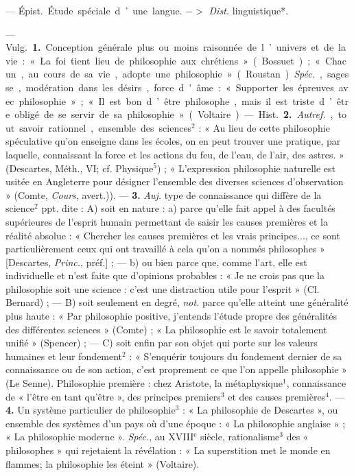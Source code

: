 \begin{itemize}[leftmargin=1cm, label=, itemsep=1pt]
 — \si{Épist.} Étude spéciale d’une
langue. $->$ {\it Dist.} linguistique*.

 — \si{Vulg.} {\bf 1.} Conception
générale plus ou moins raisonnée de
l’univers et de la vie : « La foi tient
lieu de philosophie aux chrétiens »
(Bossuet) ; « Chacun, au cours de sa
vie, adopte une philosophie » (Roustan). {\it Spéc.}, sagesse, modération
dans les désirs, force d'âme : « Supporter les épreuves avec philosophie »; « Il est bon d’être philosophe,
mais il est triste d’être obligé de se
servir de sa philosophie » (Voltaire).

— \si{Hist.} {\bf 2.} {\it Autref.}, tout savoir
rationnel, ensemble des sciences$^2$ :
« Au lieu de cette philosophie spéculative qu’on enseigne dans les écoles,
on en peut trouver une pratique,
par laquelle, connaissant la force et
les actions du feu, de l’eau, de l'air,
des astres. » (Descartes, Méth., VI;
cf. Physique$^5$) ; « L'expression philosophie naturelle est usitée en Angleterre pour désigner l’ensemble des
diverses sciences d'observation »
(Comte, {\it Cours}, avert.)). — {\bf 3.} {\it Auj.}
type de connaissance qui diffère de
la science$^2$ ppt. dite : A) soit en
nature : a) parce qu’elle fait appel à
des facultés supérieures de l’esprit
humain permettant de saisir les
causes premières et la réalité absolue : « Chercher les causes premières
et les vrais principes..., ce sont particulièrement ceux qui ont travaillé
à cela qu’on a nommés philosophes »
[Descartes, {\it Princ.}, préf.] ; — b) ou
bien parce que, comme l’art, elle est
individuelle et n’est faite que d'opinions probables : « Je ne crois pas
que la philosophie soit une science :
c’est une distraction utile pour
l'esprit » (Cl. Bernard) ; — B) soit
seulement en degré, {\it not.} parce qu’elle
atteint une généralité plus haute :
« Par philosophie positive, j'entends
l’étude propre des généralités des
différentes sciences » (Comte) ; « La
philosophie est le savoir totalement
unifié » (Spencer) ; — C) soit enfin
par son objet qui porte sur les valeurs
humaines et leur fondement$^2$ : « S’enquérir toujours du fondement dernier de sa connaissance ou de son
action, c’est proprement ce que l’on
appelle philosophie » (Le Senne).
Philosophie première : chez Aristote,
la métaphysique$^1$, connaissance de
« l'être en tant qu'être », des principes premiers$^3$ et des causes premières$^4$. — {\bf 4.} Un système particulier de philosophie$^3$ : « La philosophie de Descartes », ou ensemble des
systèmes d'un pays où d’une époque : « La philosophie anglaise » ;
« La philosophie moderne ». {\it Spéc.},
au {\footnotesize XVIII}$^\text{e}$ siècle, rationalisme$^3$ des
« philosophes » qui rejetaient la
révélation : « La superstition met le
monde en flammes; la philosophie
les éteint » (Voltaire).


\end{itemize}
